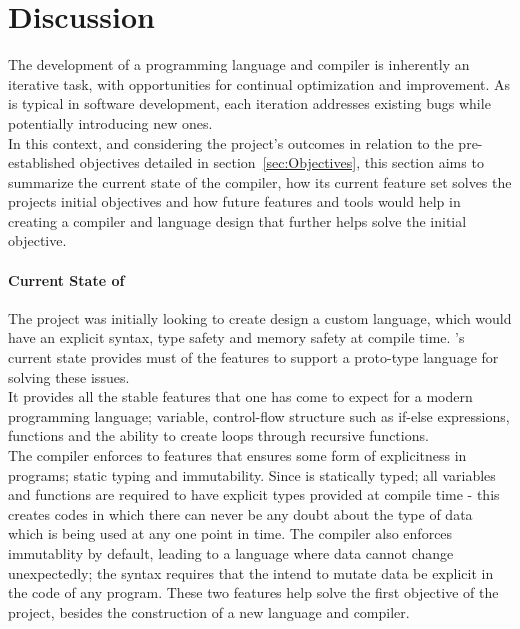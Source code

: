 \section{Discussion}
\label{sec:Discussion}

The development of a programming language and compiler is inherently an iterative
task, with opportunities for continual optimization and improvement. As is typical in
software development, each iteration addresses existing bugs while potentially
introducing new ones. \\

In this context, and considering the project's outcomes in relation to the
pre-established objectives detailed in section~\ref{sec:Objectives}, this section
aims to summarize the current state of the \lang{} compiler, how its current feature
set solves the projects initial objectives and how future features and tools would
help in creating a compiler and language design that further helps solve the initial
objective.

\paragraph*{Current State of \lang{}} \hfill 

The project was initially looking to create design a custom language, which would
have an explicit syntax, type safety and memory safety at compile time. \lang's
current state provides must of the features to support a proto-type language for
solving these issues. \\

It provides all the stable features that one has come to expect for a modern
programming language; variable, control-flow structure such as if-else expressions,
functions and the ability to create loops through recursive functions. \\

The \lang{} compiler enforces to features that ensures some form of explicitness in
\lang{} programs; static typing and immutability. Since \lang{} is statically typed;
all variables and functions are required to have explicit types provided at compile
time - this creates codes in which there can never be any doubt about the type of
data which is being used at any one point in time. The \lang{} compiler also enforces
immutablity by default, leading to a language where data cannot change unexpectedly;
the syntax requires that the intend to mutate data be explicit in the code of any
\lang{} program. These two features help solve the first objective of the project,
besides the construction of a new language and compiler.\\

